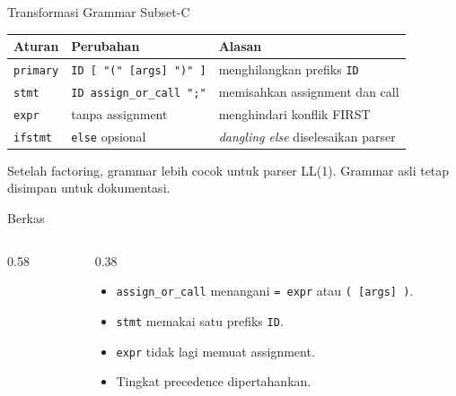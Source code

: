 \documentclass[aspectratio=169,10pt,t]{beamer}
\begin{document}
\begin{frame}{Transformasi Grammar Subset-C}
  \scriptsize
  \setlength{\tabcolsep}{4pt}
  \begin{tabular}{@{}p{2.4cm}p{6.2cm}p{4.8cm}@{}}
    \toprule
    \textbf{Aturan} & \textbf{Perubahan} & \textbf{Alasan} \\
    \midrule
    \texttt{primary} & \texttt{ID [ "(" [args] ")" ]} &
      menghilangkan prefiks \texttt{ID} \\
    \texttt{stmt} & \texttt{ID assign\_or\_call ";"} &
      memisahkan assignment dan call \\
    \texttt{expr} & tanpa assignment &
      menghindari konflik FIRST \\
    \texttt{ifstmt} & \texttt{else} opsional &
      \textit{dangling else} diselesaikan parser \\
    \bottomrule
  \end{tabular}

  \vspace{5pt}
  {\scriptsize\color{ubbblue!75}Setelah factoring, grammar lebih cocok
  untuk parser LL(1). Grammar asli tetap disimpan untuk dokumentasi.}
\end{frame}

\begin{frame}[fragile]{Berkas }
  \begin{columns}[T,onlytextwidth]
    \begin{column}{0.58\textwidth}
      
    \end{column}
    \begin{column}{0.38\textwidth}
      \begin{itemize}
        \item \texttt{assign\_or\_call} menangani \texttt{= expr} atau
              \texttt{( [args] )}.
        \item \texttt{stmt} memakai satu prefiks \texttt{ID}.
        \item \texttt{expr} tidak lagi memuat assignment.
        \item Tingkat precedence dipertahankan.
      \end{itemize}
    \end{column}
  \end{columns}
\end{frame}
\end{document}
